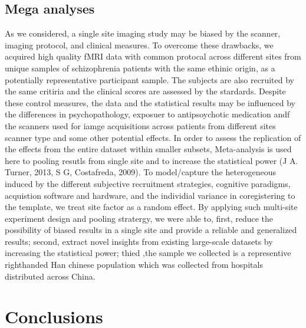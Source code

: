 \documentclass[preprint,authoryear,review,12pt,times]{elsarticle}
\begin{document}
\subsection*{Mega analyses}
As we considered, a single site imaging study may be biased by the scanner, imaging protocol, and clinical measures. To overcome these drawbacks, we acquired high quality fMRI data with common protocal across different sites from unique samples of schizophrenia patients with the same ethinic origin, as a potentially representative participant sample. The subjects are also recruited by the same critiria and the clinical scores are assessed by the stardards. Despite these control measures, the data and the statistical results may be influenced by the differences in psychopathology, exposuer to antipsoychotic medication andf the scanners used for iamge acquisitions across patients from different sites scanner type and some other potential effects. In order to assess the replication of the effects from the entire dataset within smaller subsets, Meta-analysis is used here to pooling resutls from single site and to increase the statistical power (J A. Turner, 2013, S G, Costafreda, 2009). To model/capture the heterogeneous induced by the different subjective recruitment strategies, cognitive paradigms, acquistion software and hardware, and the individial variance in coregistering to the template, we treat site factor as a random effect. By applying such multi-site experiment design and pooling stratergy, we were able to, first, reduce the possibility of biased results in a single site and provide a reliable and generalized results; second, extract novel insights from existing large-scale datasets by increasing the statistical power; thied ,the sample we collected is a representive righthanded Han chinese population which was collected from hospitals distributed across China.



\section*{Conclusions}



\end{document}
